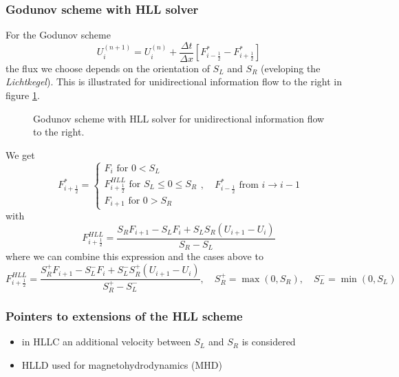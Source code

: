 \subsubsection{Godunov scheme with HLL solver}
For the Godunov scheme
\begin{equation}
    U_i^{(n+1)} = U_i^{(n)} + \frac{\Delta t}{\Delta x} \left[ F^*_{i-\frac{1}{2}} - F^*_{i+\frac{1}{2}} \right]
\end{equation}
the flux we choose depends on the orientation of $S_L$ and $S_R$ (eveloping the \textit{Lichtkegel}).
This is illustrated for unidirectional information flow to the right in figure \ref{fig:godunov_unidir}.

\begin{figure}[htb!]
    \centering
    
    \caption{Godunov scheme with HLL solver for unidirectional information flow to the right.}
    \label{fig:godunov_unidir}
\end{figure}

We get
\begin{equation}
    F_{i+\frac{1}{2}}^*=\left\{\begin{array}{c}
        F_i \text { for } 0<S_L \\
        F_{i+\frac{1}{2}}^{H L L} \text { for } S_L \leq 0 \leq S_R\\
        F_{i+1} \text { for } 0>S_R
        \end{array}\right., \quad F_{i-\frac{1}{2}}^* \text { from } i \rightarrow i-1 
\end{equation}
with
\begin{equation}
    F_{i+\frac{1}{2}}^{H L L}=\frac{S_R F_{i+1}-S_L F_i+S_L S_R\left(U_{i+1}-U_i\right)}{S_R-S_L}
\end{equation}
where we can combine this expression and the cases above to
\begin{equation}
    F_{i+\frac{1}{2}}^{H L L}=\frac{S_R^+ F_{i+1}-S_L^- F_i+S_L^- S_R^+\left(U_{i+1}-U_i\right)}{S_R^+-S_L^-}, \quad S_R^+ = \max(0, S_R), \quad S_L^- = \min(0, S_L)
\end{equation}

\subsubsection{Pointers to extensions of the HLL scheme}
\begin{itemize}
    \item in HLLC an additional velocity between $S_L$ and $S_R$ is considered
    \item HLLD used for magnetohydrodynamics (MHD)
\end{itemize}

